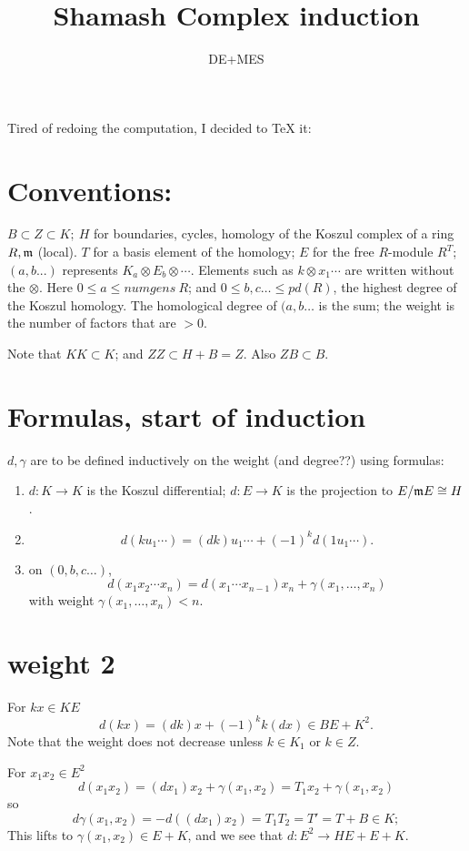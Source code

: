 \documentclass[11pt]{amsart}
\title{Shamash Complex induction}
\author{DE+MES}
\def\g{{\gamma}}
\def\mm{{\frak m}}
\begin{document}
\maketitle
Tired of redoing the computation, I decided to TeX it:

\section{Conventions:} $B\subset Z \subset K;\ H$ for boundaries, cycles, homology of the Koszul complex of a  ring $R,\mm$ (local). $T$ for a basis element of the homology; $E$ for the free $R$-module $R^T$; 
$(a,b...)$ represents $K_a\otimes E_b\otimes \cdots$. Elements such as $k\otimes x_1\cdots$ are written without the $\otimes$.
Here $0\leq a\leq numgens\ R$; and $0\leq b,c\dots\leq pd(R)$, the highest degree of the Koszul homology. The homological degree of $(a,b\dots$ is the sum; the weight is the
number of factors that are $>0$.

Note that $KK \subset K$; and $ZZ\subset H+B = Z$. Also $ZB\subset B$.

\section{Formulas, start of induction}
$d,\g$ are to be defined inductively on the weight (and degree??) using formulas:

\begin{enumerate}
\item $d:K\to K$ is the Koszul differential; $d: E \to K$ is the projection to $E/\mm E \cong H$.
\item 
$$
d(ku_1\cdots) = (dk)u_1\cdots +(-1)^kd(1u_1\cdots).
$$
\item
on $(0,b,c\dots)$, 
$$
d(x_1x_2\cdots x_n) = d(x_1\cdots x_{n-1})x_n+\g(x_1,\dots, x_n)
$$
with weight $\g(x_1,\dots, x_n)<n$.
\end{enumerate}

\section{weight 2} 
For $kx\in KE$ 
$$
d(kx) = (dk)x+(-1)^k k(dx) \in BE+K^2.
$$
Note that the weight does not decrease unless $k\in K_1$ or $k \in Z$.

For $x_1x_2\in E^2$
$$
d(x_1x_2)= (dx_1)x_2 +\g(x_1,x_2) = T_1x_2+\gamma(x_1,x_2)
$$
so 
$$
d\gamma(x_1,x_2) = -d((dx_1)x_2) = T_1T_2 = T' = T+B  \in K;
$$
This lifts to $\g(x_1,x_2) \in E+K$, 
and we see that $d:E^2\to HE+ E+K$.
\end{document}
